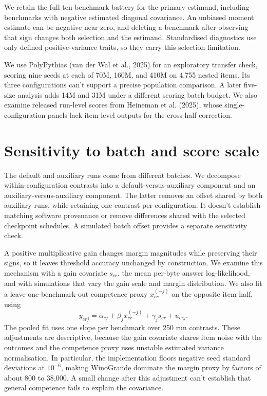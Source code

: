 \documentclass{article}
\begin{document}
We retain the full ten-benchmark battery for the primary estimand, including benchmarks with negative estimated diagonal covariance. An unbiased moment estimate can be negative near zero, and deleting a benchmark after observing that sign changes both selection and the estimand. Standardised diagnostics use only defined positive-variance traits, so they carry this selection limitation.

We use PolyPythias (van der Wal et al., 2025) for an exploratory transfer check, scoring nine seeds at each of 70M, 160M, and 410M on 4,755 nested items. Its three configurations can't support a precise population comparison. A later five-size analysis adds 14M and 31M under a different scoring batch budget. We also examine released run-level scores from Heineman et al. (2025), whose single-configuration panels lack item-level outputs for the cross-half correction.

\section{Sensitivity to batch and score scale}
The default and auxiliary runs come from different batches. We decompose within-configuration contrasts into a default-versus-auxiliary component and an auxiliary-versus-auxiliary component. The latter removes an offset shared by both auxiliary runs, while retaining one contrast per configuration. It doesn't establish matching software provenance or remove differences shared with the selected checkpoint schedules. A simulated batch offset provides a separate sensitivity check.

A positive multiplicative gain changes margin magnitudes while preserving their signs, so it leaves threshold accuracy unchanged by construction. We examine this mechanism with a gain covariate $s_{cr}$, the mean per-byte answer log-likelihood, and with simulations that vary the gain scale and margin distribution. We also fit a leave-one-benchmark-out competence proxy $x_{cr}^{(-j)}$ on the opposite item half, using
\begin{equation}
y_{crj}=\alpha_{cj}+\beta_jx_{cr}^{(-j)}+\gamma_js_{cr}+u_{crj}.
\end{equation}
The pooled fit uses one slope per benchmark over 250 run contrasts. These adjustments are descriptive, because the gain covariate shares item noise with the outcomes and the competence proxy uses unstable estimated variance normalisation. In particular, the implementation floors negative seed standard deviations at $10^{-6}$, making WinoGrande dominate the margin proxy by factors of about 800 to 38,000. A small change after this adjustment can't establish that general competence fails to explain the covariance.
\end{document}
